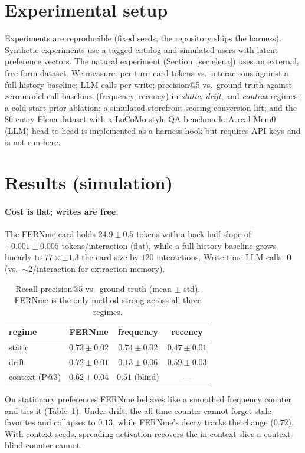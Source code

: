 \documentclass[11pt]{article}
\begin{document}
\section{Experimental setup}
Experiments are reproducible (fixed seeds; the repository ships the harness). Synthetic
experiments use a tagged catalog and simulated users with latent preference vectors. The
natural experiment (Section~\ref{sec:elena}) uses an external, free-form dataset. We
measure: per-turn card tokens vs.\ interactions against a full-history baseline; LLM calls
per write; precision@5 vs.\ ground truth against zero-model-call baselines (frequency, recency)
in \emph{static}, \emph{drift}, and \emph{context} regimes; a cold-start prior ablation; a
simulated storefront scoring conversion lift; and the 86-entry Elena dataset with a
LoCoMo-style QA benchmark. A real Mem0 (LLM) head-to-head is implemented as a harness hook
but requires API keys and is not run here.

\section{Results (simulation)}\label{sec:results}
\paragraph{Cost is flat; writes are free.} The FERNme card holds $24.9 \pm 0.5$ tokens
with a back-half slope of $+0.001 \pm 0.005$ tokens/interaction (flat), while a
full-history baseline grows linearly to $77\times \pm 1.3$ the card size by $120$
interactions. Write-time LLM calls: $\mathbf{0}$ (vs.\ ${\sim}2$/interaction for extraction
memory).

\begin{table}[t]\centering
\caption{Recall precision@5 vs.\ ground truth (mean $\pm$ std). FERNme is the only method
strong across all three regimes.}\label{tab:recall}
\begin{tabular}{lccc}
\toprule
regime & FERNme & frequency & recency\\
\midrule
static & $0.73 \pm 0.02$ & $0.74 \pm 0.02$ & $0.47 \pm 0.01$\\
drift & $\mathbf{0.72 \pm 0.01}$ & $0.13 \pm 0.06$ & $0.59 \pm 0.03$\\
context (P@3) & $\mathbf{0.62 \pm 0.04}$ & $0.51$ (blind) & ---\\
\bottomrule
\end{tabular}
\end{table}

On stationary preferences FERNme behaves like a smoothed frequency counter and ties it
(Table~\ref{tab:recall}). Under drift, the all-time counter cannot forget stale favorites
and collapses to $0.13$, while FERNme's decay tracks the change ($0.72$). With context
seeds, spreading activation recovers the in-context slice a context-blind counter cannot.
\end{document}
